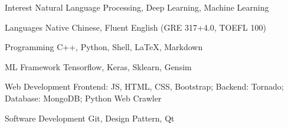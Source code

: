 

\begin{cvskills}


  \cvskill
    {Interest} %
    {Natural Language Processing, Deep Learning, Machine Learning} %

    

  \cvskill
    {Languages} %
    {Native Chinese, Fluent English (GRE 317+4.0, TOEFL 100)} %


  \cvskill
    {Programming} %
    {C++, Python, Shell, LaTeX, Markdown} %

  \cvskill
    {ML Framework} %
    {Tensorflow, Keras, Sklearn, Gensim} %

  \cvskill
    {Web Development} %
    {Frontend: JS, HTML, CSS, Bootstrap; Backend: Tornado; Database: MongoDB; Python Web Crawler} %

  \cvskill
    {Software Development} %
    {Git, Design Pattern, Qt} %

\end{cvskills}
